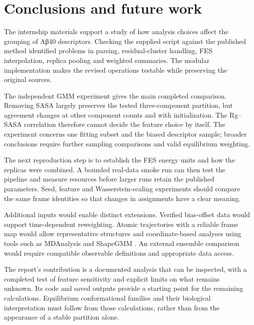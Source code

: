 \chapter{Conclusions and future work}
The internship materials support a study of how analysis choices affect the grouping of Aβ40 descriptors. Checking the supplied script against the published method identified problems in parsing, residual-cluster handling, FES interpolation, replica pooling and weighted summaries. The modular implementation makes the revised operations testable while preserving the original sources.

The independent GMM experiment gives the main completed comparison. Removing SASA largely preserves the tested three-component partition, but agreement changes at other component counts and with initialization. The Rg--SASA correlation therefore cannot decide the feature choice by itself. The experiment concerns one fitting subset and the biased descriptor sample; broader conclusions require further sampling comparisons and valid equilibrium weighting.

The next reproduction step is to establish the FES energy units and how the replicas were combined. A bounded real-data smoke run can then test the pipeline and measure resources before larger runs retain the published parameters. Seed, feature and Wasserstein-scaling experiments should compare the same frame identities so that changes in assignments have a clear meaning.

Additional inputs would enable distinct extensions. Verified bias-offset data would support time-dependent reweighting. Atomic trajectories with a reliable frame map would allow representative structures and coordinate-based analyses using tools such as MDAnalysis and ShapeGMM \autocite{michaud2011,sasmal2024}. An external ensemble comparison would require compatible observable definitions and appropriate data access.

The report's contribution is a documented analysis that can be inspected, with a completed test of feature sensitivity and explicit limits on what remains unknown. Its code and saved outputs provide a starting point for the remaining calculations. Equilibrium conformational families and their biological interpretation must follow from those calculations, rather than from the appearance of a stable partition alone.
